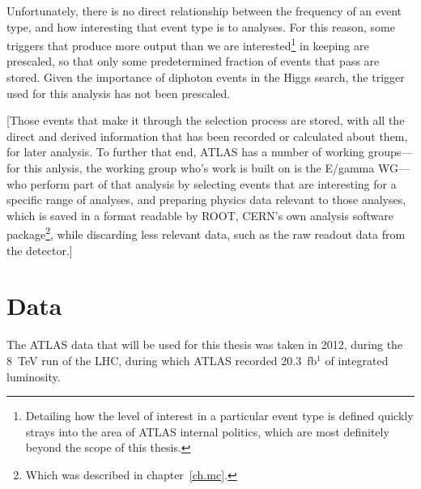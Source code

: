 \begin{english}
Unfortunately, there is no direct relationship between the frequency of an event type, and how interesting that event type is to analyses. For this reason, some triggers that produce more output than we are interested\footnote{Detailing how the level of interest in a particular event type is defined quickly strays into the area of ATLAS internal politics, which are most definitely beyond the scope of this thesis.} in keeping are prescaled, so that only some predetermined fraction of events that pass are stored. Given the importance of diphoton events in the Higgs search, the trigger used for this analysis has not been prescaled.

[Those events that make it through the selection process are stored, with all the direct and derived information that has been recorded or calculated about them, for later analysis. To further that end, ATLAS has a number of working groups---for this anlysis, the working group who's work is built on is the E/gamma WG---who perform part of that analysis by selecting events that are interesting for a specific range of analyses, and preparing physics data relevant to those analyses, which is saved in a format readable by ROOT, CERN's own analysis software package\footnote{Which was described in chapter~\ref{ch.mc}.}, while discarding less relevant data, such as the raw readout data from the detector.]

\chapter{Data}
The ATLAS data that will be used for this thesis was taken in 2012, during the 8~TeV run of the LHC, during which ATLAS recorded 20.3~fb$^{1}$ of integrated luminosity.


\end{english}
